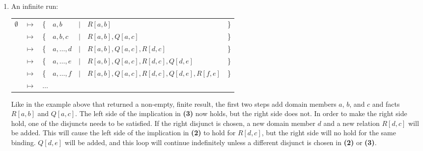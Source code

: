 \begin{enumerate}
		\item An infinite run:

			\begin{tabular}{lllllll}
				$\emptyset$ & $\mapsto$ & \{ & $a,b$        & $|$ & $R[a,b]$                                 & \} \\
				{}          & $\mapsto$ & \{ & $a,b,c$      & $|$ & $R[a,b], Q[a,c]$                         & \} \\
				{}          & $\mapsto$ & \{ & $a,\ldots,d$ & $|$ & $R[a,b], Q[a,c], R[d,c]$                 & \} \\
				{}          & $\mapsto$ & \{ & $a,\ldots,e$ & $|$ & $R[a,b], Q[a,c], R[d,c], Q[d,e]$         & \} \\
				{}          & $\mapsto$ & \{ & $a,\ldots,f$ & $|$ & $R[a,b], Q[a,c], R[d,c], Q[d,e], R[f,e]$ & \} \\
				{}          & $\mapsto$ & \multicolumn{5}{l}{ $\ldots$ }                                          \\
			\end{tabular}

			Like in the example above that returned a non-empty, finite result,
			the first two steps add domain members $a$, $b$, and $c$ and facts
			$R[a,b]$ and $Q[a,c]$. The left side of the implication in
			\textbf{(3)} now holds, but the right side does not. In order to
			make the right side hold, one of the disjuncts needs to be
			satisfied. If the right disjunct is chosen, a new domain member $d$
			and a new relation $R[d,c]$ will be added.  This will cause the
			left side of the implication in \textbf{(2)} to hold for $R[d,c]$,
			but the right side will no hold for the same binding. $Q[d,e]$ will
			be added, and this loop will continue indefinitely unless a
			different disjunct is chosen in \textbf{(2)} or \textbf{(3)}.

		\end{enumerate}
